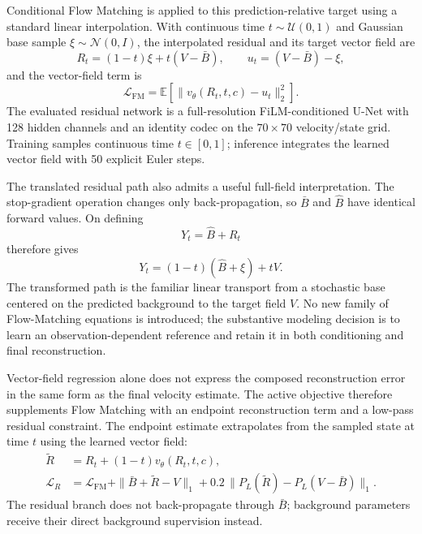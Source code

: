 Conditional Flow Matching is applied to this prediction-relative target using a standard linear interpolation. With continuous time $t\sim\mathcal U(0,1)$ and Gaussian base sample $\xi\sim\mathcal N(0,I)$, the interpolated residual and its target vector field are
\begin{equation}
R_t=(1-t)\xi+t(V-\bar B),
\qquad
u_t=(V-\bar B)-\xi ,
\end{equation}
and the vector-field term is
\begin{equation}
\mathcal L_{\mathrm{FM}}
=
\mathbb E\left[
\|v_\theta(R_t,t,c)-u_t\|_2^2
\right].
\end{equation}
The evaluated residual network is a full-resolution FiLM-conditioned U-Net \citep{perez2018film} with 128 hidden channels and an identity codec on the $70\times70$ velocity/state grid. Training samples continuous time $t\in[0,1]$; inference integrates the learned vector field with 50 explicit Euler steps.

The translated residual path also admits a useful full-field interpretation. The stop-gradient operation changes only back-propagation, so $\bar B$ and $\hat B$ have identical forward values. On defining
\begin{equation}
Y_t=\hat B+R_t
\end{equation}
therefore gives
\begin{equation}
Y_t=(1-t)(\hat B+\xi)+tV.
\label{eq:background-centered-path}
\end{equation}
The transformed path is the familiar linear transport from a stochastic base centered on the predicted background to the target field $V$. No new family of Flow-Matching equations is introduced; the substantive modeling decision is to learn an observation-dependent reference and retain it in both conditioning and final reconstruction.

Vector-field regression alone does not express the composed reconstruction error in the same form as the final velocity estimate. The active objective therefore supplements Flow Matching with an endpoint reconstruction term and a low-pass residual constraint. The endpoint estimate extrapolates from the sampled state at time $t$ using the learned vector field:
\begin{align}
\widetilde R
&=R_t+(1-t)v_\theta(R_t,t,c),\\
\mathcal L_R
&=
\mathcal L_{\mathrm{FM}}
+\|\bar B+\widetilde R-V\|_1
+0.2\,\|P_L(\widetilde R)-P_L(V-\bar B)\|_1.
\label{eq:residual-loss-final}
\end{align}
The residual branch does not back-propagate through $\bar B$; background parameters receive their direct background supervision instead.

